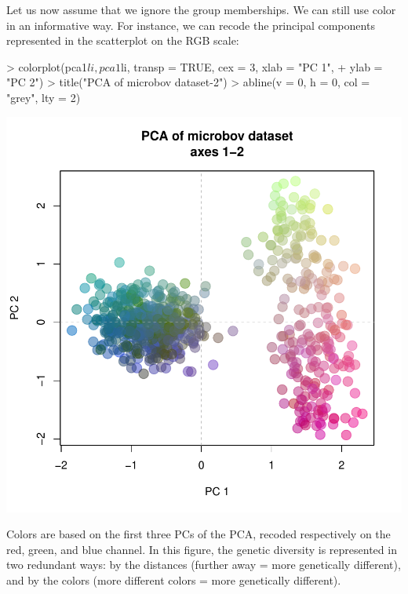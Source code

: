 \documentclass{article}
\begin{document}
Let us now assume that we ignore the group memberships.
We can still use color in an informative way.
For instance, we can recode the principal components represented in the scatterplot on the RGB
scale:
\begin{Schunk}
\begin{Sinput}
> colorplot(pca1$li, pca1$li, transp = TRUE, cex = 3, xlab = "PC 1", 
+     ylab = "PC 2")
> title("PCA of microbov dataset-2")
> abline(v = 0, h = 0, col = "grey", lty = 2)
\end{Sinput}
\end{Schunk}
\includegraphics{figs/base-074}

\noindent Colors are based on the first three PCs of the PCA, recoded respectively on the red, green, and blue channel.
In this figure, the genetic diversity is represented in two redundant ways: by the distances
(further away = more genetically different), and by the colors (more different colors = more
genetically different).
\\
\end{document}
